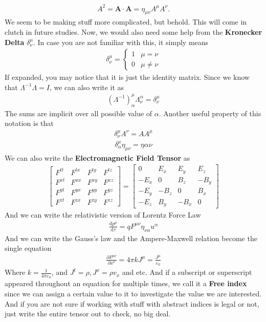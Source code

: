 \documentclass[12pt]{book}
\newcommand{\pypx}[2]{\frac{\partial #1}{\partial #2}}
\newcommand{\paren}[1]{\left( #1 \right)}
\newcommand{\etensor}[3]{#1_{#3}^{#2}}
\begin{document}
\begin{align}
A^2 = \mathbf{A} \cdot \mathbf{A} = \eta_{\mu \nu} A^\mu A^\nu. 
\end{align}
We seem to be making stuff more complicated, but behold. This will come in clutch in future studies. Now, we would also need some help from the \textbf{Kronecker Delta} $\etensor{\delta}{\mu}{\nu}$. In case you are not familiar with this, it simply means
\begin{align}
\etensor{\delta}{\mu}{\nu} = \begin{cases}
    1 &\mu=\nu\\
    0 &\mu\neq\nu
\end{cases}
\end{align}
If expanded, you may notice that it is just the identity matrix. Since we know that $\Lambda^{-1}\Lambda = I$, we can also write it as
\begin{align}
\etensor{\paren{\Lambda^{-1}}}{\mu}{\alpha}\etensor{\Lambda}{\alpha}{\nu} = \etensor{\delta}{\mu}{\nu}
\end{align}
The sums are implicit over all possible value of $\alpha$. Another useful property of this notation is that
\begin{align}
\etensor{\delta}{\mu}{\nu}A^{\nu } = AA^{\mu}
\end{align}
\begin{align}
\etensor{\delta}{\mu}{\alpha}\eta_{\mu\nu} = \eta{\alpha\nu}
\end{align}
We can also write the \textbf{Electromagnetic Field Tensor} as
\begin{align}
\begin{bmatrix}
F^{tt} & F^{tx} & F^{ty} & F^{tz} \\
F^{xt} & F^{xx} & F^{xy} & F^{xz} \\
F^{yt} & F^{yx} & F^{yy} & F^{yz} \\
F^{zt} & F^{zx} & F^{zy} & F^{zz}
\end{bmatrix}
=
\begin{bmatrix}
0 & E_x & E_y & E_z \\
-E_x & 0 & B_z & -B_y \\
-E_y & -B_z & 0 & B_x \\
-E_z & B_y & -B_x & 0
\end{bmatrix}
\end{align}  
And we can write the relativistic version of Lorentz Force Law
\begin{align}
\frac{\text{d}p^\mu}{\text{d}\tau}=qF^{\mu\nu}\eta_{\nu\alpha}u^{\alpha}
\end{align}
And we can write the Gauss's law and the Ampere-Maxwell relation become the single equation
\begin{align}
\pypx{F^{\mu\nu}}{x^\nu} = 4\pi k J^\mu = \frac{J^{\mu}}{\varepsilon_0}
\end{align}
Where $k = \frac{1}{4\pi\varepsilon_0}$, and $J^t = \rho,J^x=\rho v_x$ and etc. And if a subscript or superscript appeared throughout an equation for multiple times, we call it a \textbf{Free index} since we can assign a certain value to it to investigate the value we are interested. 
And if you are not sure if working with stuff with abstract indices is legal or not, just write the entire tensor out to check, no big deal. 
\end{document}
